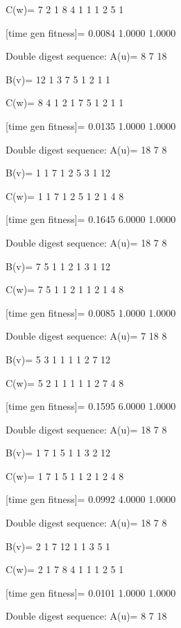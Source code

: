 C(w)=
     7     2     1     8     4     1     1     1     2     5     1

[time gen fitness]=
    0.0084    1.0000    1.0000

Double digest sequence:
A(u)=
     8     7    18

B(v)=
    12     1     3     7     5     1     2     1     1

C(w)=
     8     4     1     2     1     7     5     1     2     1     1

[time gen fitness]=
    0.0135    1.0000    1.0000

Double digest sequence:
A(u)=
    18     7     8

B(v)=
     1     1     7     1     2     5     3     1    12

C(w)=
     1     1     7     1     2     5     1     2     1     4     8

[time gen fitness]=
    0.1645    6.0000    1.0000

Double digest sequence:
A(u)=
    18     7     8

B(v)=
     7     5     1     1     2     1     3     1    12

C(w)=
     7     5     1     1     2     1     1     2     1     4     8

[time gen fitness]=
    0.0085    1.0000    1.0000

Double digest sequence:
A(u)=
     7    18     8

B(v)=
     5     3     1     1     1     1     2     7    12

C(w)=
     5     2     1     1     1     1     1     2     7     4     8

[time gen fitness]=
    0.1595    6.0000    1.0000

Double digest sequence:
A(u)=
    18     7     8

B(v)=
     1     7     1     5     1     1     3     2    12

C(w)=
     1     7     1     5     1     1     2     1     2     4     8

[time gen fitness]=
    0.0992    4.0000    1.0000

Double digest sequence:
A(u)=
    18     7     8

B(v)=
     2     1     7    12     1     1     3     5     1

C(w)=
     2     1     7     8     4     1     1     1     2     5     1

[time gen fitness]=
    0.0101    1.0000    1.0000

Double digest sequence:
A(u)=
     8     7    18

